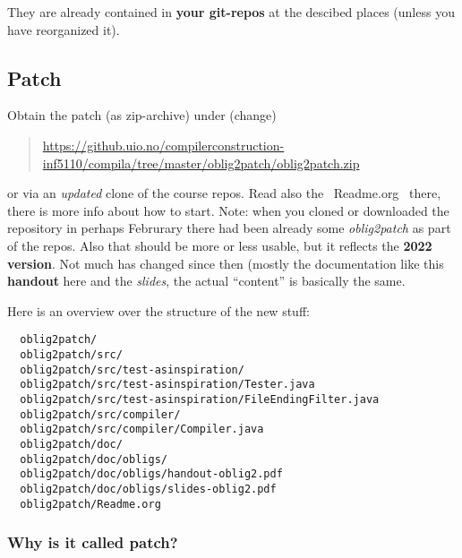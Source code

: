 \documentclass[11pt,freeform]{handout}[2014/08/13]
\begin{document}
They are already contained in \textbf{your git-repos} at the descibed
places (unless you have reorganized it).

\subsection*{Patch}
\label{sec:patch}


Obtain the patch (as zip-archive) under  (change)

\begin{quote}
  \url{https://github.uio.no/compilerconstruction-inf5110/compila/tree/master/oblig2patch/oblig2patch.zip}
\end{quote}

or via an \emph{updated} clone of the course repos. Read also the
~Readme.org~ there, there is more info about how to start. Note: when you
cloned or downloaded the repository in perhaps Februrary there had been
already some \emph{oblig2patch} as part of the repos. Also that should be
more or less usable, but it reflects the \textbf{2022 version}. Not much
has changed since then (mostly the documentation like this \textbf{handout}
here and the \emph{slides}, the actual ``content'' is basically the same.

Here is an overview over the structure of the new stuff:


\begin{verbatim}
  oblig2patch/
  oblig2patch/src/
  oblig2patch/src/test-asinspiration/
  oblig2patch/src/test-asinspiration/Tester.java
  oblig2patch/src/test-asinspiration/FileEndingFilter.java
  oblig2patch/src/compiler/
  oblig2patch/src/compiler/Compiler.java
  oblig2patch/doc/
  oblig2patch/doc/obligs/
  oblig2patch/doc/obligs/handout-oblig2.pdf
  oblig2patch/doc/obligs/slides-oblig2.pdf
  oblig2patch/Readme.org
\end{verbatim}


\subsubsection{Why is it called patch?}
\label{sec:why-it-called}
\end{document}
